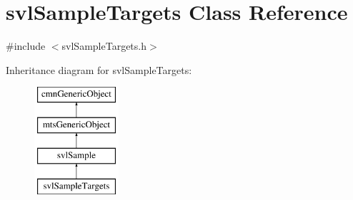\hypertarget{classsvl_sample_targets}{\section{svl\-Sample\-Targets Class Reference}
\label{classsvl_sample_targets}
}


{\ttfamily \#include $<$svl\-Sample\-Targets.\-h$>$}

Inheritance diagram for svl\-Sample\-Targets\-:\begin{figure}[H]
\begin{center}
\leavevmode
\includegraphics[height=4.000000cm]{dc/dc4/classsvl_sample_targets}
\end{center}
\end{figure}
